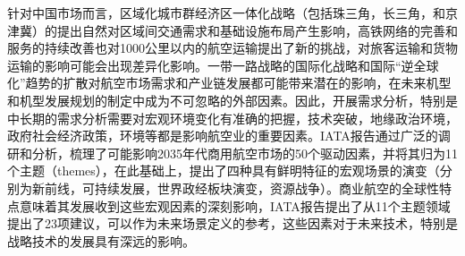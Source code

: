 \documentclass[12pt,a4paper]{report}
\begin{document}
针对中国市场而言，区域化城市群经济区一体化战略（包括珠三角，长三角，和京津冀）的提出自然对区域间交通需求和基础设施布局产生影响，高铁网络的完善和服务的持续改善也对1000公里以内的航空运输提出了新的挑战，对旅客运输和货物运输的影响可能会出现差异化影响。一带一路战略的国际化战略和国际“逆全球化”趋势的扩散对航空市场需求和产业链发展都可能带来潜在的影响，在未来机型和机型发展规划的制定中成为不可忽略的外部因素。因此，开展需求分析，特别是中长期的需求分析需要对宏观环境变化有准确的把握，技术突破，地缘政治环境，政府社会经济政策，环境等都是影响航空业的重要因素。IATA报告通过广泛的调研和分析\cite{iata2035}，梳理了可能影响2035年代商用航空市场的50个驱动因素，并将其归为11个主题（themes），在此基础上，提出了四种具有鲜明特征的宏观场景的演变（分别为新前线，可持续发展，世界政经板块演变，资源战争）。商业航空的全球性特点意味着其发展收到这些宏观因素的深刻影响，IATA报告提出了从11个主题领域提出了23项建议，可以作为未来场景定义的参考，这些因素对于未来技术，特别是战略技术的发展具有深远的影响。
\end{document}
